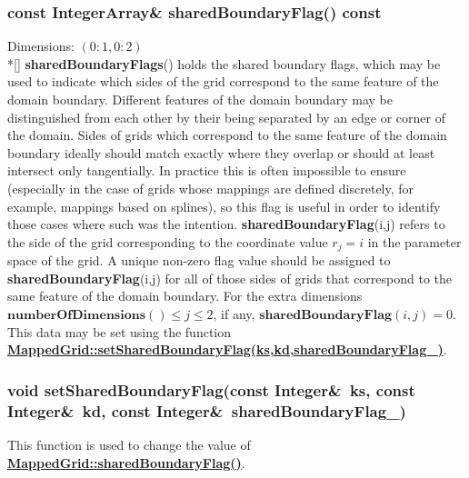 \documentclass{article}
\begin{document}
  \subsubsection{const IntegerArray\& sharedBoundaryFlag() const}
  \label{MappedGrid::sharedBoundaryFlag()}
    Dimensions: $(0\colon1,0\colon2)$ \\*[\parskip]
    \textbf{sharedBoundaryFlags}() holds the shared boundary flags, which may be used to
    indicate which sides of the grid correspond to the same feature of the domain boundary.
    Different features of the domain boundary may be distinguished from each other by their
    being separated by an edge or corner of the domain.  Sides of grids which correspond to
    the same feature of the domain boundary ideally should match exactly where they overlap
    or should at least intersect only tangentially.  In practice this is often impossible
    to ensure (especially in the case of grids whose mappings are defined discretely, for
    example, mappings based on splines), so this flag is useful in order to identify those
    cases where such was the intention.
    \textbf{sharedBoundaryFlag}(i,j) refers to the side of the grid corresponding to
    the coordinate value $r_j = i$ in the parameter space of the grid.
    A unique non-zero flag value should be assigned to \textbf{sharedBoundaryFlag}(i,j)
    for all of those sides of grids that correspond to the same feature of the domain boundary.
    For the extra dimensions $\textbf{numberOfDimensions}()\le j \le 2$, if any, $\textbf{sharedBoundaryFlag}(i,j)=0$.
    This data may be set using the function
    {\bf{}\hyperref{setSharedBoundaryFlag(ks,kd,sharedBoundaryFlag\_)}{setSharedBoundaryFlag(ks,kd,sharedBoundaryFlag\_) \rm(\S}{)}{MappedGrid::setSharedBoundaryFlag(ks,kd,sharedBoundaryFlag_)}}.

  \subsubsection{void setSharedBoundaryFlag(const Integer\&~ks, const Integer\&~kd, const Integer\&~sharedBoundaryFlag\_)}
  \label{MappedGrid::setSharedBoundaryFlag(ks,kd,sharedBoundaryFlag_)}
    This function is used to change the value of
    {\bf{}\hyperref{sharedBoundaryFlag()}{sharedBoundaryFlag() \rm(\S}{)}{MappedGrid::sharedBoundaryFlag()}}.
\end{document}
